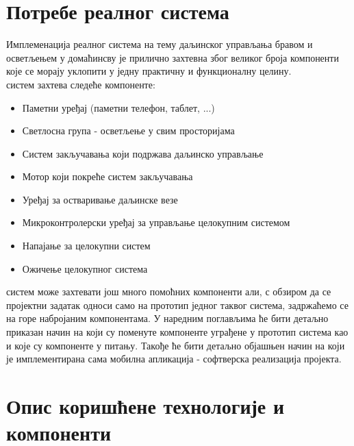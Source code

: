 \documentclass[12pt]{article}
\begin{document}
\section{Потребе реалног система}
\justifying
Имплеменација реалног система на тему даљинског управљања бравом и осветљењем у домаћинсву је прилично захтевна због великог броја компоненти које се морају уклопити у једну практичну и функционалну целину.
\vspace{0.3cm}\\ систем захтева следеће компоненте:
\begin{itemize}
  \item Паметни уређај (паметни телефон, таблет, ...)
  \item Светлосна група - осветљење у свим просторијама
  \item Систем закључавања који подржава даљинско управљање
  \item Мотор који покреће систем закључавања
  \item Уређај за остваривање даљинске везе
  \item Микроконтролерски уређај за управљање целокупним системом
  \item Напајање за целокупни систем
  \item Ожичење целокупног система
\end{itemize}
\vspace{0.3cm}
\indent{} систем може захтевати још много помоћних компоненти али, с обзиром да се пројектни задатак односи само на прототип једног таквог система, задржаћемо се на горе набројаним компонентама. У наредним поглављима ће бити детаљно приказан начин на који су поменуте компоненте уграђене у прототип система као и које су компоненте у питању. Такође ће бити детаљно објашњен начин на који је имплементирана сама мобилна апликација - софтверска реализација пројекта.

\newpage
\section{Опис коришћене технологије и компоненти}
\end{document}
